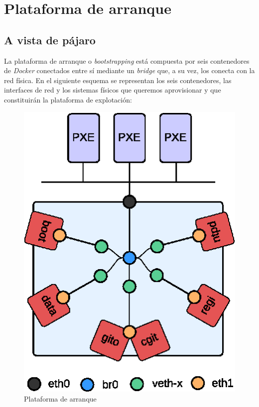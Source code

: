 \documentclass[a4paper,12pt,spanish,final]{epsc_tfc_pfc}
\begin{document}

\chapter{Plataforma de arranque}

\section{A vista de pájaro}

La plataforma de arranque o \emph{bootstrapping} está compuesta por seis contenedores de \emph{Docker} conectados entre sí mediante un \emph{bridge} que, a su vez, los conecta con la red física. En el siguiente esquema se representan los seis contenedores, las interfaces de red y los sistemas físicos que queremos aprovisionar y que constituirán la plataforma de explotación:

\begin{figure}
\vspace{-15pt}
\begin{center}
  \includegraphics[scale=1]{booddies2}
  \caption{Plataforma de arranque}
\end{center}
\vspace{-110pt}
\end{figure}
\end{document}
